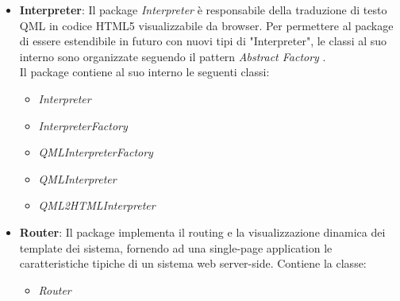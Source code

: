 \begin{itemize}
	\item \textbf{Interpreter}:
	Il package \emph{Interpreter} è responsabile della traduzione di testo QML in codice HTML5 visualizzabile da browser. Per permettere al package di essere estendibile in futuro con nuovi tipi di "Interpreter", le classi al suo interno sono organizzate seguendo il pattern \emph{Abstract Factory} . \\
	Il package contiene al suo interno le seguenti classi:
	\begin{itemize}
	\item \textit{Interpreter}
	\item \textit{InterpreterFactory}
	\item \textit{QMLInterpreterFactory}
	\item \textit{QMLInterpreter}
	\item \textit{QML2HTMLInterpreter}
	\end{itemize}
		
	\item \textbf{Router}:
Il package implementa il routing e la visualizzazione dinamica dei template dei sistema, fornendo ad una single-page application le caratteristiche tipiche di un sistema web server-side. Contiene la classe:
\begin{itemize}
	\item\textit{Router}
\end{itemize}
\end{itemize}